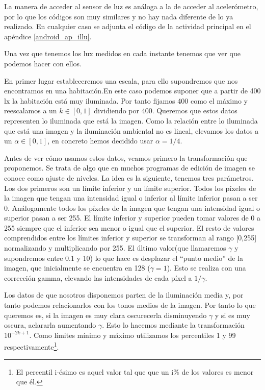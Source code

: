 \documentclass[a4paper,openright, 12pt]{book}
\begin{document}
La manera de acceder al sensor de luz es análoga a la de acceder al acelerómetro, por lo que los códigos son muy similares y no hay nada diferente de lo ya realizado. En cualquier caso se adjunta el código de la actividad principal en el apéndice \ref{android_ap_illu}.

Una vez que tenemos los lux medidos en cada instante tenemos que ver que podemos hacer con ellos. 

En primer lugar estableceremos una escala, para ello supondremos que nos encontramos en una habitación.En este caso podemos suponer que a partir de 400 lx la habitación está muy iluminada. Por tanto fijamos 400 como el máximo y reescalamos a un  $k \in [0,1]$ dividiendo por 400. Queremos que estos datos representen lo iluminada que está la imagen. 
Como la relación entre lo iluminada que está una imagen y la iluminación ambiental no es lineal, elevamos los datos a un $\alpha  \in [0,1]$, en concreto hemos decidido usar  $\alpha = 1/4$.

Antes de ver cómo usamos estos datos, veamos primero la transformación que proponemos. Se trata de algo que en muchos programas de edición de imagen se conoce como ajuste de niveles. 
La idea es la siguiente, tenemos tres parámetros. Los dos primeros son un límite inferior y un límite superior.  Todos los píxeles de la imagen que tengan una intensidad igual o inferior al límite inferior pasan a ser 0. Análogamente todos los píxeles de la imagen que tengan una intensidad igual o superior pasan a ser 255. El límite inferior y superior pueden tomar valores de 0 a 255 siempre que el inferior sea menor o igual que el superior.
El resto de valores comprendidos entre los límites inferior y superior se transforman al rango [0,255] normalizando y multiplicando por 255.
El último valor(que llamaremos $\gamma$ y supondremos entre 0.1 y 10) lo que hace es desplazar el ``punto medio'' de la imagen, que inicialmente se encuentra en 128 ($\gamma=1$). Esto se realiza con una corrección gamma, elevando las intensidades de cada píxel a $1/\gamma$.

Los datos de que nosotros disponemos parten de la iluminación media y, por tanto podemos relacionarlos con los tonos medios de la imagen. Por tanto lo que queremos es, si la imagen es muy clara oscurecerla disminuyendo $\gamma$ y si es muy oscura, aclararla aumentando $\gamma$.
Esto lo hacemos mediante la transformación $10^{-2k+1}$.
Como límites mínimo y máximo utilizamos los percentiles 1 y 99 respectivamente\footnote{El percentil i-ésimo es aquel valor tal que que un i\% de los valores es menor que él.}.
\end{document}
